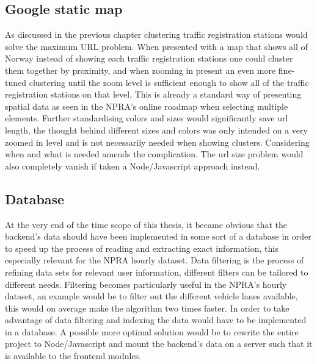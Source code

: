 \subsection{Google static map}
As discussed in the previous chapter clustering traffic registration stations would solve the maximum URL problem. When presented with a map that shows all of Norway instead of showing each traffic registration stations one could cluster them together by proximity, and when zooming in present an even more fine-tuned clustering until the zoom level is sufficient enough to show all of the traffic registration stations on that level. This is already a standard way of presenting spatial data as seen in the NPRA's online roadmap\cite{vegkart} when selecting multiple elements. Further standardising colors and sizes would significantly save url length, the thought behind different sizes and colors was only intended on a very zoomed in level and is not necessarily needed when showing clusters. Considering when and what is needed amends the complication. The url size problem would also completely vanish if taken a Node/Javascript approach instead. 

\subsection{Database}
At the very end of the time scope of this thesis, it became obvious that the backend's data should have been implemented in some sort of a database in order to speed up the process of reading and extracting exact information, this especially relevant for the NPRA hourly dataset. Data filtering is the process of refining data sets for relevant user information, different filters can be tailored to different needs. Filtering becomes particularly useful in the NPRA's hourly dataset, an example would be to filter out the different vehicle lanes available, this would on average make the algorithm two times faster. In order to take advantage of data filtering and indexing the data would have to be implemented in a database. A possible more optimal solution would be to rewrite the entire project to Node/Javascript and mount the backend's data on a server such that it is available to the frontend modules.


